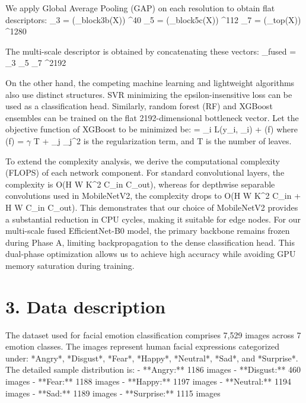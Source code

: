 \documentclass[journal,10pt]{IEEEtran}
\begin{document}
We apply Global Average Pooling (GAP) on each resolution to obtain flat descriptors:
\_3 = (\Phi\_{block3b}(X)) \in {}^{40}
\_5 = (\Phi\_{block5c}(X)) \in {}^{112}
\_7 = (\Phi\_{top}(X)) \in {}^{1280}

The multi-scale descriptor is obtained by concatenating these vectors:
\_{fused} = \_3 \oplus {}\_5 \oplus {}\_7 \in {}^{2192}

On the other hand, the competing machine learning and lightweight algorithms also use distinct structures. SVR minimizing the epsilon-insensitive loss can be used as a classification head. Similarly, random forest (RF) and XGBoost ensembles can be trained on the flat 2192-dimensional bottleneck vector. Let the objective function of XGBoost to be minimized be:
 = \sum\_{i} L(y\_i, \_i) + \Omega(f)
where \Omega(f) = $\gamma$ T + \lambda \sum\_j \omega\_j^2 is the regularization term, and T is the number of leaves.

To extend the complexity analysis, we derive the computational complexity (FLOPS) of each network component. For standard convolutional layers, the complexity is O(H \times W \times K^2 \times C\_{in} \times C\_{out}), whereas for depthwise separable convolutions used in MobileNetV2, the complexity drops to O(H \times W \times K^2 \times C\_{in} + H \times W \times C\_{in} \times C\_{out}). This demonstrates that our choice of MobileNetV2 provides a substantial reduction in CPU cycles, making it suitable for edge nodes. For our multi-scale fused EfficientNet-B0 model, the primary backbone remains frozen during Phase A, limiting backpropagation to the dense classification head. This dual-phase optimization allows us to achieve high accuracy while avoiding GPU memory saturation during training.

\section{3. Data description}
The dataset used for facial emotion classification comprises 7,529 images across 7 emotion classes. The images represent human facial expressions categorized under: *Angry*, *Disgust*, *Fear*, *Happy*, *Neutral*, *Sad*, and *Surprise*. The detailed sample distribution is:
- **Angry:** 1186 images
- **Disgust:** 460 images
- **Fear:** 1188 images
- **Happy:** 1197 images
- **Neutral:** 1194 images
- **Sad:** 1189 images
- **Surprise:** 1115 images
\end{document}
